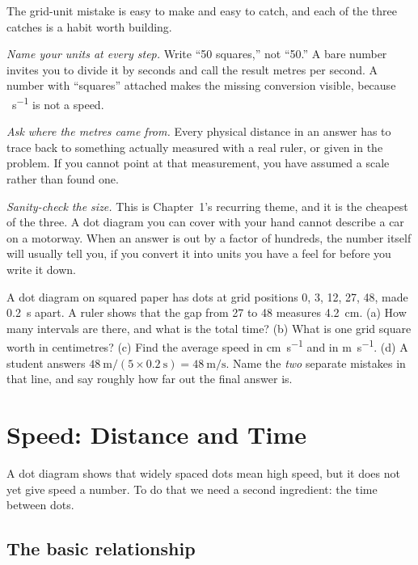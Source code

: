 \documentclass[11pt,twoside,openany]{book}
\newcounter{check}[chapter]
\begin{document}
\begin{modelnote}
The grid-unit mistake is easy to make and easy to catch, and each of the three catches is a habit worth building.

\emph{Name your units at every step.} Write ``\num{50} squares,'' not ``\num{50}.'' A bare number invites you to divide it by seconds and call the result metres per second. A number with ``squares'' attached makes the missing conversion visible, because \si{\per\second} is not a speed.

\emph{Ask where the metres came from.} Every physical distance in an answer has to trace back to something actually measured with a real ruler, or given in the problem. If you cannot point at that measurement, you have assumed a scale rather than found one.

\emph{Sanity-check the size.} This is Chapter~1's recurring theme, and it is the cheapest of the three. A dot diagram you can cover with your hand cannot describe a car on a motorway. When an answer is out by a factor of hundreds, the number itself will usually tell you, if you convert it into units you have a feel for before you write it down.
\end{modelnote}

\begin{checkbox}
A dot diagram on squared paper has dots at grid positions \num{0}, \num{3}, \num{12}, \num{27}, \num{48}, made \SI{0.2}{\second} apart. A ruler shows that the gap from \num{27} to \num{48} measures \SI{4.2}{\centi\metre}. (a) How many intervals are there, and what is the total time? (b) What is one grid square worth in centimetres? (c) Find the average speed in \si{\centi\metre\per\second} and in \si{\metre\per\second}. (d) A student answers $\SI{48}{\metre}/(5 \times \SI{0.2}{\second}) = \SI{48}{\metre\per\second}$. Name the \emph{two} separate mistakes in that line, and say roughly how far out the final answer is.
\end{checkbox}

\section{Speed: Distance and Time}
\label{sec:speed}

A dot diagram shows that widely spaced dots mean high speed, but it does not yet give speed a number. To do that we need a second ingredient: the time between dots.

\subsection{The basic relationship}
\end{document}
